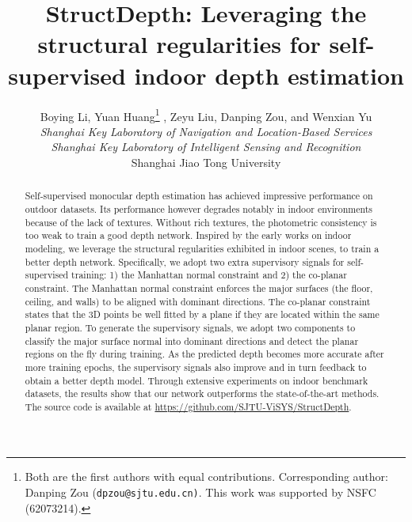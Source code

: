 \documentclass[10pt,twocolumn,letterpaper]{article}
\begin{document}
	


\title{StructDepth: Leveraging the structural regularities 
	for self-supervised indoor depth estimation}

\author{Boying Li, Yuan Huang\thanks{Both are the first authors with equal contributions. Corresponding author: Danping Zou ({\tt\small dpzou@sjtu.edu.cn)}. This work was supported by NSFC (62073214).} , Zeyu Liu, Danping Zou, and Wenxian Yu\\
	\emph{Shanghai Key Laboratory of Navigation and Location-Based Services}\\
	\emph{Shanghai Key Laboratory of Intelligent Sensing and Recognition}\\ Shanghai Jiao Tong University\\
} 

\maketitle


\begin{abstract}
	Self-supervised monocular depth estimation has achieved impressive performance on outdoor datasets. Its performance however degrades notably in indoor environments because of the lack of textures. Without rich textures, the photometric consistency is too weak to train a good depth network. Inspired by the early works on indoor modeling, we leverage the structural regularities exhibited in indoor scenes, to train a better depth network. Specifically, we adopt two extra supervisory signals for self-supervised training: 1) the Manhattan normal constraint and 2) the co-planar constraint. The Manhattan normal constraint enforces the major surfaces (the floor, ceiling, and walls) to be aligned with dominant directions. The co-planar constraint states that the 3D points be well fitted by a plane if they are located within the same planar region. To generate the supervisory signals, we adopt two components to classify the major surface normal into dominant directions and detect the planar regions on the fly during training. As the predicted depth becomes more accurate after more training epochs, the supervisory signals also improve and in turn feedback to obtain a better depth model. Through extensive experiments on indoor benchmark datasets, the results show that our network outperforms the state-of-the-art methods. The source code is available at  \url{https://github.com/SJTU-ViSYS/StructDepth}.  \end{abstract}
\end{document}

